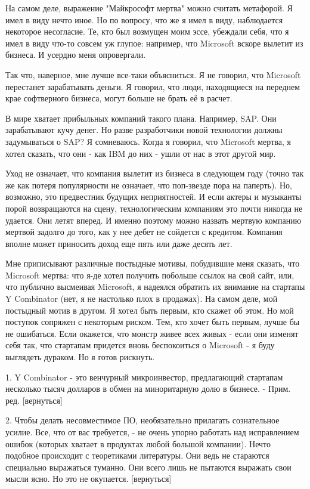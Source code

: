 \documentclass[ebook,12pt,oneside,openany]{memoir}
\begin{document}
На самом деле, выражение "Майкрософт мертва" можно считать метафорой.
Я имел в виду нечто иное. Но по вопросу, что же я имел в виду,
наблюдается некоторое несогласие. Те, кто был возмущен моим эссе,
убеждали себя, что я имел в виду что-то совсем уж глупое: например,
что Microsoft вскоре вылетит из бизнеса. И усердно меня опровергали.

Так что, наверное, мне лучше все-таки объясниться. Я не говорил, что
Microsoft перестанет зарабатывать деньги. Я говорил, что люди,
находящиеся на переднем крае софтверного бизнеса, могут больше не
брать её в расчет.

В мире хватает прибыльных компаний такого плана. Например, SAP. Они
зарабатывают кучу денег. Но разве разработчики новой технологии должны
задумываться о SAP? Я сомневаюсь. Когда я говорил, что Microsoft
мертва, я хотел сказать, что они - как IBM до них - ушли от нас в этот
другой мир.

Уход не означает, что компания вылетит из бизнеса в следующем году
(точно так же как потеря популярности не означает, что поп-звезде пора
на паперть). Но, возможно, это предвестник будущих неприятностей. И
если актеры и музыканты порой возвращаются на сцену, технологическим
компаниям это почти никогда не удается. Они летят вперед. И именно
поэтому можно назвать мертвую компанию мертвой задолго до того, как у
нее дебет не сойдется с кредитом. Компания вполне может приносить
доход еще пять или даже десять лет.

Мне приписывают различные постыдные мотивы, побудившие меня сказать,
что Microsoft мертва: что я-де хотел получить побольше ссылок на свой
сайт, или, что публично высмеивая Microsoft, я надеялся обратить их
внимание на стартапы Y Combinator (нет, я не настолько плох в
продажах). На самом деле, мой постыдный мотив в другом. Я хотел быть
первым, кто скажет об этом. Но мой поступок сопряжен с некоторым
риском. Тем, кто хочет быть первым, лучше бы не ошибаться. Если
окажется, что монстр живее всех живых - если они изменят себя так, что
стартапам придется вновь беспокоиться о Microsoft - я буду выглядеть
дураком. Но я готов рискнуть.

1. Y Combinator - это венчурный микроинвестор, предлагающий стартапам
несколько тысяч долларов в обмен на миноритарную долю в бизнесе. -
Прим. ред. [вернуться]

2. Чтобы делать несовместимое ПО, необязательно прилагать сознательное
усилие. Все, что от вас требуется, - не очень упорно работать над
исправлением ошибок (которых хватает в продуктах любой большой
компании). Нечто подобное происходит с теоретиками литературы. Они
ведь не стараются специально выражаться туманно. Они всего лишь не
пытаются выражать свои мысли ясно. Но это не окупается. [вернуться]
\end{document}

